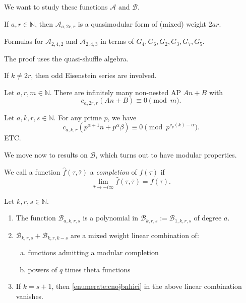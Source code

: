 \documentclass[reqno]{amsart} 
\begin{document}
We want to study these functions $\mathcal{A}$ and $\mathcal{B}$.

\begin{theorem}
  If $a, r \in \mathbb{N}$, then $\mathcal{A}_{a, 2 r, r}$ is a quasimodular form of (mixed) weight $2 a r$.
\end{theorem}
\begin{example}
  Formulas for $\mathcal{A}_{2, 4, 2}$ and $\mathcal{A}_{2, 4, 3}$ in terms of $G_4, G_6, G_2, G_3, G_7, G_5$.
\end{example}
\begin{remark}
  The proof uses the quasi-shuffle algebra.
\end{remark}
\begin{remark}
  If $k \neq 2 r$, then odd Eisenstein series are involved.
\end{remark}

\begin{corollary}
  Let $a, r, m \in \mathbb{N}$.  There are infinitely many non-nested AP $A n + B$ with
  \begin{equation*}
    c_{a, 2 r, r}(A n + B) \equiv 0 \pmod{m}.
  \end{equation*}
\end{corollary}
\begin{conjecture}
  Let $a,k,r,s \in \mathbb{N}$.  For any prime $p$, we have
  \begin{equation*}
    c_{a, k , r}(p^{\alpha + 1} n + p^\alpha \beta) \equiv 0 \pmod{p^{\nu_p(k) - \alpha}}.
  \end{equation*}
  ETC.
\end{conjecture}

We move now to results on $\mathcal{B}$, which turns out to have modular properties.
\begin{definition}
  We call a function $\hat{f}(\tau, \bar{\tau})$ a \emph{completion} of $f(\tau)$ if
  \begin{equation*}
    \lim_{\bar{\tau} \rightarrow - i \infty}
    \hat{f}(\tau, \bar{\tau})
    = f(\tau).
  \end{equation*}
\end{definition}
\begin{theorem}
  Let $k, r, s \in \mathbb{N}$.
  \begin{enumerate}
  \item The function $\mathcal{B}_{a, k, r, s}$ is a polynomial in $\mathcal{B}_{k, r, s} := \mathcal{B}_{1, k, r, s}$ of degree $a$.
  \item $\mathcal{B}_{k, r, s} + \mathcal{B}_{k, r, k - s}$ are a mixed weight linear combination of:
    \begin{enumerate}[(a)]
    \item functions admitting a modular completion
    \item\label{enumerate:cnojbnhici} powers of $q$ times theta functions
    \end{enumerate}
  \item If $k = s + 1$, then \eqref{enumerate:cnojbnhici} in the above linear combination vanishes.
  \end{enumerate}
\end{theorem}
\end{document}

